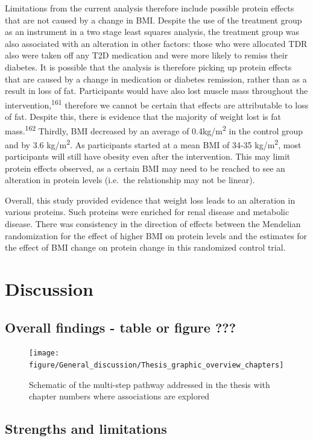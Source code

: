 \documentclass[11pt,twoside]{bristolthesis}
\begin{document}
Limitations from the current analysis therefore include possible protein effects that are not caused by a change in BMI. Despite the use of the treatment group as an instrument in a two stage least squares analysis, the treatment group was also associated with an alteration in other factors: those who were allocated TDR also were taken off any T2D medication and were more likely to remiss their diabetes. It is possible that the analysis is therefore picking up protein effects that are caused by a change in medication or diabetes remission, rather than as a result in loss of fat. Participants would have also lost muscle mass throughout the intervention,\textsuperscript{161} therefore we cannot be certain that effects are attributable to loss of fat. Despite this, there is evidence that the majority of weight lost is fat mass.\textsuperscript{162} Thirdly, BMI decreased by an average of 0.4kg/m\textsuperscript{2} in the control group and by 3.6 kg/m\textsuperscript{2}. As participants started at a mean BMI of 34-35 kg/m\textsuperscript{2}, most participants will still have obesity even after the intervention. This may limit protein effects observed, as a certain BMI may need to be reached to see an alteration in protein levels (i.e.~the relationship may not be linear).

Overall, this study provided evidence that weight loss leads to an alteration in various proteins. Such proteins were enriched for renal disease and metabolic disease. There was consistency in the direction of effects between the Mendelian randomization for the effect of higher BMI on protein levels and the estimates for the effect of BMI change on protein change in this randomized control trial.

\hypertarget{discussion-5}{%
\chapter{Discussion}\label{discussion-5}}

\hypertarget{overall-findings---table-or-figure}{%
\section{Overall findings - table or figure ???}\label{overall-findings---table-or-figure}}
\begin{figure}
\texttt{[image: figure/General\_discussion/Thesis\_graphic\_overview\_chapters]} \caption[Schematic of the multi-step pathway addressed in the thesis with chapter numbers]{Schematic of the multi-step pathway addressed in the thesis with chapter numbers where associations are explored}\label{fig:Thesis-schematic-chaps}
\end{figure}
\hypertarget{strengths-and-limitations}{%
\section{Strengths and limitations}\label{strengths-and-limitations}}
\end{document}
